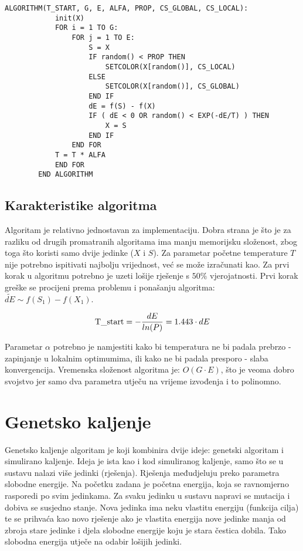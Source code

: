 \documentclass[times, utf8, diplomski, numeric]{fer}
\begin{document}
\begin{singlespace}
	\begin{lstlisting}[caption=Pseudok\^{o}d simuliranog kaljenja]
		ALGORITHM(T_START, G, E, ALFA, PROP, CS_GLOBAL, CS_LOCAL):
			init(X)
			FOR i = 1 TO G:
				FOR j = 1 TO E:
					S = X
					IF random() < PROP THEN
						SETCOLOR(X[random()], CS_LOCAL)
					ELSE
						SETCOLOR(X[random()], CS_GLOBAL)
					END IF
					dE = f(S) - f(X)
					IF ( dE < 0 OR random() < EXP(-dE/T) ) THEN
						X = S
					END IF
				END FOR
			T = T * ALFA
			END FOR
		END ALGORITHM
	\end{lstlisting}
\end{singlespace}

\subsection{Karakteristike algoritma}

Algoritam je relativno jednostavan za implementaciju. Dobra strana je što je za razliku od drugih promatranih algoritama ima manju memorijsku složenost, zbog toga što koristi samo dvije jedinke ($X$ i $S$). Za parametar početne temperature $T$ nije potrebno ispitivati najbolju vrijednost, već se može izračunati kao. Za prvi korak u algoritmu potrebno je uzeti lošije rješenje s $50\%$ vjerojatnosti. Prvi korak greške se procijeni prema problemu i ponašanju algoritma: $\tilde{dE}\sim f(S_1)-f(X_1)$.  

\begin{equation}
\textup{T\_start} = -\frac{dE}{ln(P)} = 1.443 \cdot dE
\end{equation}  

Parametar $\alpha$ potrebno je namjestiti kako bi temperatura ne bi padala prebrzo - zapinjanje u lokalnim optimumima, ili kako ne bi padala presporo - slaba konvergencija. Vremenska složenost algoritma je: $O(G\cdot E)$, što je veoma dobro svojstvo jer samo dva parametra utječu na vrijeme izvođenja i to polinomno. 

\section{Genetsko kaljenje}

Genetsko kaljenje \cite{lit18} algoritam je koji kombinira dvije ideje: genetski algoritam i simulirano kaljenje. Ideja je ista kao i kod simuliranog kaljenje, samo što se u sustavu nalazi više jedinki (rješenja). Rješenja međudjeluju preko parametra slobodne energije. Na početku zadana je početna energija, koja se ravnomjerno rasporedi po svim jedinkama. Za svaku jedinku u sustavu napravi se mutacija i dobiva se susjedno stanje. Nova jedinka ima neku vlastitu energiju (funkcija cilja) te se prihvaća kao novo rješenje ako je vlastita energija nove jedinke manja od zbroja stare jedinke i djela slobodne energije koju je stara čestica dobila. Tako slobodna energija utječe na odabir lošijih jedinki.
\end{document}
